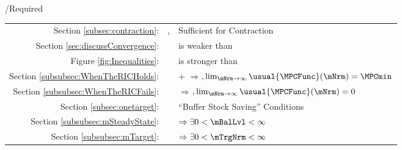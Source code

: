 \documentclass[\econtexRoot/BufferStockTheory]{subfiles}
\providecommand{\TblName}{}
\renewcommand{\TblName}{Required}
\begin{document}
\begin{verbatimwrite}{\TableDir/\TblName}
\begin{table}
{\begin{tabular}{|l|l|l|}
        \\ \cline{2-3}\multicolumn{1}{|r|}{Section \ref{subsec:contraction}:}                            & \FVAC, \WRIC                      & Sufficient for Contraction
        \\ \multicolumn{1}{|r|}{Section \ref{sec:discussConvergence}:}                               &                      & {\WRIC}{ is} weaker than \RIC 
        \\  \multicolumn{1}{|r|}{Figure \ref{fig:Inequalities}:}                                        &                                 & {\FVAC}{ is} stronger than \PFFVAC 
        \\ \multicolumn{1}{|r|}{Section \ref{subsubsec:WhenTheRICHolds}:}
                                                                                                                               &                                 & \cncl{\FHWC}+{\RIC} $\Rightarrow ${\GICRawDefn}$, \lim_{\mNrm \rightarrow \infty} \usual{\MPCFunc}(\mNrm)=\MPCmin$
        \\  \multicolumn{1}{|r|}{Section \ref{subsubsec:WhenTheRICFails}:}                                        &                                 & \cncl{\RIC}  $\Rightarrow $\cncl{\FHWC}$, \lim_{\mNrm \rightarrow \infty} \usual{\MPCFunc}(\mNrm)=0$
        \\ \cline{3-3}\multicolumn{1}{|r|}{Section \ref{subsec:onetarget}:}                                        &                                 & ``Buffer Stock Saving'' Conditions
        \\ \multicolumn{1}{|r|}{Section \ref{subsubsec:mSteadyState}:}                                        &                                 & \phantom{-Nrm}{\GICRaw} $\Rightarrow \exists 0 < \mBalLvl < \infty$ %
        \\ \multicolumn{1}{|r|}{Section \ref{subsubsec:mTarget}:}                                        &                                 & {\GICNrm} $\Rightarrow \exists 0 < \mTrgNrm < \infty$ %
                                                                                                                           

\end{tabular}}
\end{table}
\end{verbatimwrite}
\end{document}
